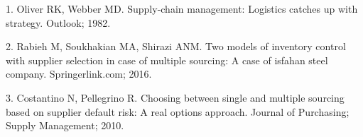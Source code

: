 \documentclass[
  12pt,
]{article}
\newlength{\cslhangindent}
\newlength{\cslentryspacingunit} %
\newenvironment{CSLReferences}[2] %
 {%
  \setlength{\parindent}{0pt}
  \ifodd #1
  \let\oldpar\par
  \def\par{\hangindent=\cslhangindent\oldpar}
  \fi
  \setlength{\parskip}{#2\cslentryspacingunit}
 }%
 {}
\begin{document}
\hypertarget{refs}{}
\begin{CSLReferences}{0}{0}
\leavevmode{}%
1. Oliver RK, Webber MD. Supply-chain management: Logistics catches up
with strategy. Outlook; 1982.

\leavevmode{}%
2. Rabieh M, Soukhakian MA, Shirazi ANM. Two models of inventory control
with supplier selection in case of multiple sourcing: A case of isfahan
steel company. Springerlink.com; 2016.

\leavevmode{}%
3. Costantino N, Pellegrino R. Choosing between single and multiple
sourcing based on supplier default risk: A real options approach.
Journal of Purchasing; Supply Management; 2010.

\end{CSLReferences}
\end{document}
